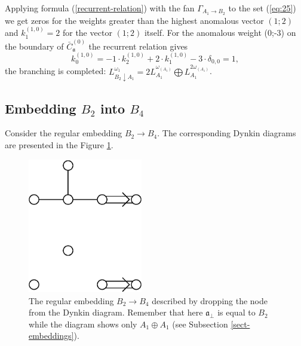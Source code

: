 \documentclass[12pt]{iopart}
\theoremstyle{definition}
\newcommand{\af}{\mathfrak{a}}
\newcommand{\afb}{\mathfrak{a}_{\bot}}
\begin{document}
Applying formula (\ref{recurrent-relation}) with the fan
$\Gamma_{A_1\to B_2}$ to the set (\ref{eq:25})
we get zeros for the weights
greater than the highest anomalous vector $(1;2)$
and $k^{(1,0)}_1=2$ for the vector $(1;2)$ itself.
For the anomalous weight (0;-3) on the boundary of $\bar{C}^{(0)}_{\af}$ the recurrent relation gives
\begin{equation*}
  \label{eq:23}
  k^{(1,0)}_{0}=-1\cdot k^{(1,0)}_2 +2\cdot k^{(1,0)}_1 - 3\cdot \delta_{0,0} = 1,
\end{equation*}
the branching is completed: $L_{B_2\downarrow A_1}^{\omega_1}=
2L_{A_1}^{\omega_{\left(A_1\right)} }
\bigoplus
L_{A_1}^{2\omega_{\left(A_1\right)} }$.

\subsection{Embedding $B_2$ into $B_4$}
\label{sec:someth-high-dimens}
Consider the regular embedding $B_2 \rightarrow B_4$.
The corresponding Dynkin diagrams are presented in the Figure \ref{fig:dynkin}.
\begin{figure}[h]
  \centering
  \includegraphics[width=50mm]{figure3.eps}
  \caption{The regular embedding $B_2 \rightarrow B_4$ described by dropping the node from the Dynkin diagram.
  Remember that here $\afb$ is equal to $B_2$ while the diagram
  shows only $A_1\oplus A_1$ (see Subsection \ref{sect-embeddings}).}
  \label{fig:dynkin}
\end{figure}
\end{document}
